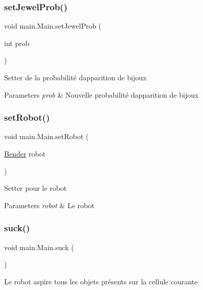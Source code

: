 \subsubsection{\texorpdfstring{set\+Jewel\+Prob()}{setJewelProb()}}
{\footnotesize\ttfamily void main.\+Main.\+set\+Jewel\+Prob (\begin{DoxyParamCaption}\item[{int}]{prob }\end{DoxyParamCaption})}

Setter de la probabilité d\textquotesingle{}apparition de bijoux 
\begin{DoxyParams}{Parameters}
{\em prob} & Nouvelle probabilité d\textquotesingle{}apparition de bijoux \\
\hline
\end{DoxyParams}
\hypertarget{classmain_1_1_main_ab2bea62d3409f687309c3ce697825c63}{}\label{classmain_1_1_main_ab2bea62d3409f687309c3ce697825c63} 
\subsubsection{\texorpdfstring{set\+Robot()}{setRobot()}}
{\footnotesize\ttfamily void main.\+Main.\+set\+Robot (\begin{DoxyParamCaption}\item[{\hyperlink{class_i_a_1_1_bender}{Bender}}]{robot }\end{DoxyParamCaption})}

Setter pour le robot 
\begin{DoxyParams}{Parameters}
{\em robot} & Le robot \\
\hline
\end{DoxyParams}
\hypertarget{classmain_1_1_main_a95439ee2c099d18cc32c6ffd785540ab}{}\label{classmain_1_1_main_a95439ee2c099d18cc32c6ffd785540ab} 
\subsubsection{\texorpdfstring{suck()}{suck()}}
{\footnotesize\ttfamily void main.\+Main.\+suck (\begin{DoxyParamCaption}{ }\end{DoxyParamCaption})}

Le robot aspire tous les objets présents sur la cellule courante \hypertarget{classmain_1_1_main_a676892cd2586d3b8d20e05451f306fba}{}\label{classmain_1_1_main_a676892cd2586d3b8d20e05451f306fba} 
